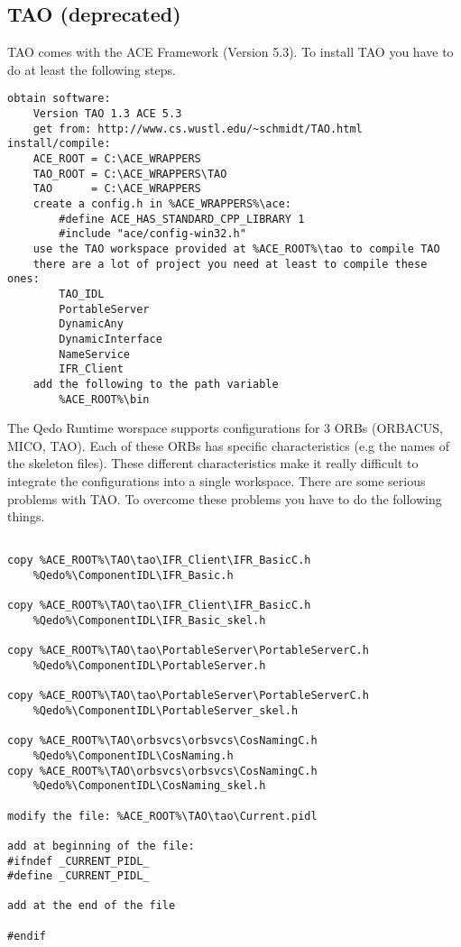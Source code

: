 \documentclass[12pt,a4paper]{report}
\begin{document}
\subsection{TAO (deprecated)}
\label{sec:TAODeprecated}

TAO comes with the ACE Framework (Version 5.3). 
To install TAO you have to do at least the following steps.
\small
\begin{verbatim}
obtain software:
	Version TAO 1.3 ACE 5.3
	get from: http://www.cs.wustl.edu/~schmidt/TAO.html
install/compile:
	ACE_ROOT = C:\ACE_WRAPPERS
	TAO_ROOT = C:\ACE_WRAPPERS\TAO
	TAO      = C:\ACE_WRAPPERS
	create a config.h in %ACE_WRAPPERS%\ace:
		#define ACE_HAS_STANDARD_CPP_LIBRARY 1
		#include "ace/config-win32.h"
	use the TAO workspace provided at %ACE_ROOT%\tao to compile TAO
	there are a lot of project you need at least to compile these ones:
		TAO_IDL
		PortableServer
		DynamicAny
		DynamicInterface
		NameService
		IFR_Client
	add the following to the path variable
		%ACE_ROOT%\bin
\end{verbatim}
\normalsize	

The Qedo Runtime worspace supports configurations for 3 ORBs (ORBACUS, MICO, TAO). Each of these ORBs has specific characteristics (e.g the names of the skeleton files). These different characteristics make it really difficult to integrate the configurations into a single workspace. There are some serious problems with TAO. To overcome these problems you have to do the following things.
\small
\begin{verbatim}

copy %ACE_ROOT%\TAO\tao\IFR_Client\IFR_BasicC.h  
	%Qedo%\ComponentIDL\IFR_Basic.h
	
copy %ACE_ROOT%\TAO\tao\IFR_Client\IFR_BasicC.h
	%Qedo%\ComponentIDL\IFR_Basic_skel.h

copy %ACE_ROOT%\TAO\tao\PortableServer\PortableServerC.h  
	%Qedo%\ComponentIDL\PortableServer.h

copy %ACE_ROOT%\TAO\tao\PortableServer\PortableServerC.h  
	%Qedo%\ComponentIDL\PortableServer_skel.h

copy %ACE_ROOT%\TAO\orbsvcs\orbsvcs\CosNamingC.h  
	%Qedo%\ComponentIDL\CosNaming.h
copy %ACE_ROOT%\TAO\orbsvcs\orbsvcs\CosNamingC.h  
	%Qedo%\ComponentIDL\CosNaming_skel.h

modify the file: %ACE_ROOT%\TAO\tao\Current.pidl

add at beginning of the file:
#ifndef _CURRENT_PIDL_
#define _CURRENT_PIDL_

add at the end of the file

#endif

\end{verbatim}
\normalsize
\end{document}
